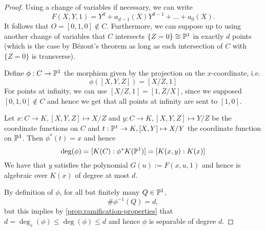 \begin{proof}
	Using a change of variables if necessary, we can write
	\begin{equation*}
		F(X, Y, 1) = Y^d + a_{d-1}(X)Y^{d-1} + \dots + a_0(X).
	\end{equation*}
	It follows that $O = [0, 1, 0] \notin C$. Furthermore, we can suppose
	up to using another change of variables that
	$C$ intersects $\{Z = 0\} \cong \mathbb{P}^1$
	in exactly $d$ points (which is the case
	by Bézout's theorem as long as each intersection of $C$ with $\{Z = 0\}$
	is transverse).

	Define $\phi: C \to \mathbb{P}^1$ the morphism given 
	by the projection on the $x$-coordinate, i.e.
	\begin{equation*}
		\phi([X, Y, Z]) = [X/Z, 1]
	\end{equation*}
	For points at infinity, we can use $[X/Z, 1] = [1, Z/X]$, since we supposed
	$[0, 1, 0] \notin C$ and hence we get that all points at infinity are sent
	to $[1, 0]$.

	Let $x: C \to K, [X, Y, Z] \mapsto X/Z$ and $y: C \to K, [X, Y, Z] \mapsto
	Y/Z$ be the coordinate functions on $C$ and $t:\mathbb{P}^1\to K, [X, Y] \mapsto
	X/Y$ the coordinate function on $\mathbb{P}^1$.
	Then $\phi^*(t) = x$ and hence
	\begin{equation*}
		\deg(\phi) = [K(C) : \phi^*K(\mathbb{P}^1)] = [K(x, y): K(x)]
	\end{equation*}
	We have that $y$ satisfies the polynomial $G(u) := F(x, u, 1)$ and hence is algebraic
	over $K(x)$ of degree at most $d$.

	By definition of $\phi$, for all but finitely many $Q \in \mathbb{P}^1$, 
	\begin{equation*}
		\#\phi^{-1}(Q) = d,
	\end{equation*}
	but this implies by \ref{prop:ramification-properties} that
	$d = \deg_s(\phi) \leq \deg(\phi) \leq d$ and hence $\phi$ is separable of
	degree $d$.


\end{proof}
